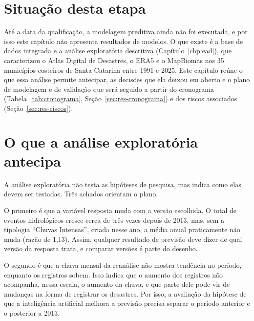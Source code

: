 %

\section{Situação desta etapa}
\label{sec:res-situacao}

Até a data da qualificação, a modelagem preditiva ainda não foi executada, e por isso este capítulo não apresenta resultados de modelos. O que existe é a base de dados integrada e a análise exploratória descritiva (Capítulo~\ref{chp:ead}), que caracterizou o Atlas Digital de Desastres, o ERA5 e o MapBiomas nos 35 municípios costeiros de Santa Catarina entre 1991 e 2025. Este capítulo reúne o que essa análise permite antecipar, as decisões que ela deixou em aberto e o plano de modelagem e de validação que será seguido a partir do cronograma (Tabela~\ref{tab:cronograma}, Seção~\ref{sec:res-cronograma}) e dos riscos associados (Seção~\ref{sec:res-riscos}).

\section{O que a análise exploratória antecipa}
\label{sec:res-antecipa}

A análise exploratória não testa as hipóteses de pesquisa, mas indica como elas devem ser testadas. Três achados orientam o plano.

O primeiro é que a variável resposta muda com a versão escolhida. O total de eventos hidrológicos cresce cerca de três vezes depois de 2013, mas, sem a tipologia ``Chuvas Intensas'', criada nesse ano, a média anual praticamente não muda (razão de 1,13). Assim, qualquer resultado de previsão deve dizer de qual versão da resposta trata, e comparar versões é parte do desenho.

O segundo é que a chuva mensal da reanálise não mostra tendência no período, enquanto os registros sobem. Isso indica que o aumento dos registros não acompanha, nessa escala, o aumento da chuva, e que parte dele pode vir de mudanças na forma de registrar os desastres. Por isso, a avaliação da hipótese de que a inteligência artificial melhora a previsão precisa separar o período anterior e o posterior a 2013.

